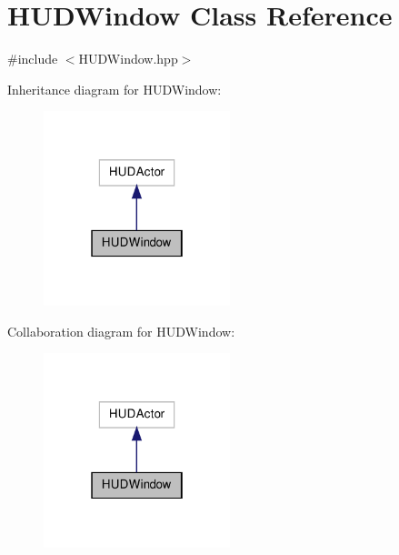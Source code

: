 \hypertarget{class_h_u_d_window}{\section{H\-U\-D\-Window Class Reference}
\label{class_h_u_d_window}
}


{\ttfamily \#include $<$H\-U\-D\-Window.\-hpp$>$}



Inheritance diagram for H\-U\-D\-Window\-:\nopagebreak
\begin{figure}[H]
\begin{center}
\leavevmode
\includegraphics[width=154pt]{class_h_u_d_window__inherit__graph}
\end{center}
\end{figure}


Collaboration diagram for H\-U\-D\-Window\-:\nopagebreak
\begin{figure}[H]
\begin{center}
\leavevmode
\includegraphics[width=154pt]{class_h_u_d_window__coll__graph}
\end{center}
\end{figure}
